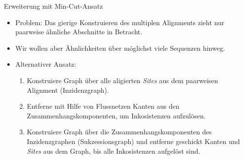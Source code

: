 \documentclass[wide,xcolor={x11names},hyperref={colorlinks=false},pantone312]{beamer}
\begin{document}
\begin{frame}[t]{Erweiterung mit Min-Cut-Ansatz}
	\begin{itemize}
		\item Problem: Das gierige Konstruieren des multiplen Alignments zieht nur paarweise ähnliche Abschnitte in Betracht. \cite{CPM10}
		\item Wir wollen aber Ähnlichkeiten über möglichst viele Sequenzen hinweg. \pause
		\item Alternativer Ansatz: \\
		\begin{enumerate}
			\item Konstruiere Graph über alle aligierten \emph{Sites} aus dem paarweisen Alignment (Inzidenzgraph).
			\item Entferne mit Hilfe von Flussnetzen Kanten aus den Zusammenhangskomponenten, um Inkosistenzen aufzulösen.
			\item Konstruiere Graph über die Zusammenhangskomponenten des Inzidenzgraphen (Sukzessionsgraph) und entferne geschickt Kanten und \emph{Sites} aus dem Graph, bis alle Inkosistenzen aufgelöst sind.
		\end{enumerate}		
	\end{itemize}
\end{frame}
\end{document}

